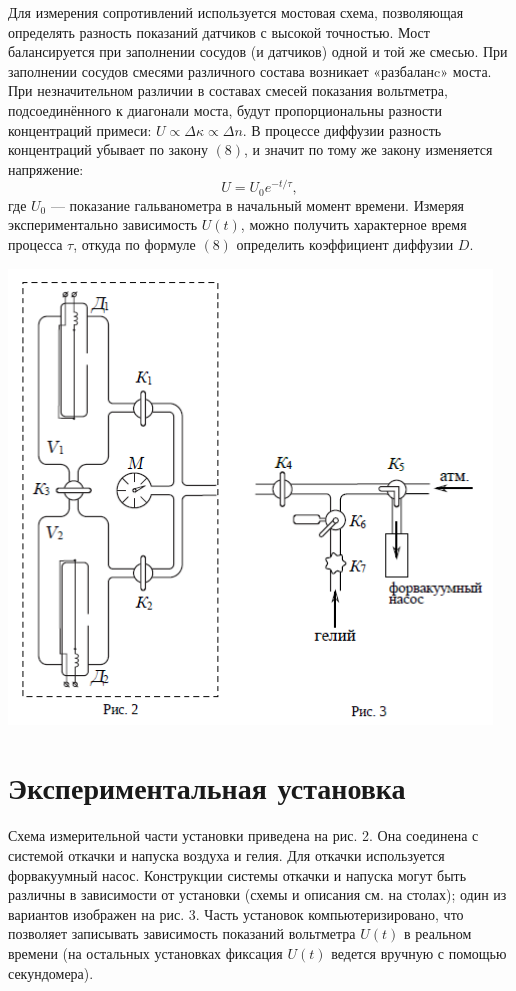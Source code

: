 \documentclass[a4paper,11.5pt]{article} %
\begin{document}
Для измерения сопротивлений используется мостовая схема, позволяющая определять разность показаний датчиков с высокой точностью. Мост балансируется при заполнении сосудов (и датчиков) одной и той же смесью. При заполнении сосудов смесями различного состава возникает «разбаланc» моста. При незначительном различии в составах смесей показания вольтметра, подсоединённого к диагонали моста, будут пропорциональны разности концентраций примеси: $U \propto \Delta \kappa \propto \Delta n$. В процессе диффузии разность концентраций убывает по закону $(8)$, и значит по тому же закону изменяется напряжение: 
\begin{equation}
	U = U_0 e^{-t/\tau},
\end{equation}
где $U_0$ --- показание гальванометра в начальный момент времени. Измеряя экспериментально зависимость $U(t)$, можно получить характерное время процесса $\tau$, откуда по формуле $(8)$ определить коэффициент диффузии $D$.
\begin{center}
    \includegraphics[scale = 0.67]{2212.png}
\end{center}

\section{Экспериментальная установка}

Схема измерительной части установки приведена на рис. 2. Она соединена с системой откачки и напуска воздуха и гелия. Для откачки используется форвакуумный насос. Конструкции системы откачки и напуска могут быть различны в зависимости от установки (схемы и описания см. на столах); один из вариантов изображен на рис. 3. Часть установок компьютеризировано, что позволяет записывать зависимость показаний вольтметра $U(t)$ в реальном времени (на остальных установках фиксация $U(t)$ ведется вручную с помощью секундомера).
\end{document}
